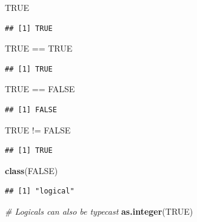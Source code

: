 \documentclass[a4paper]{book}
\newenvironment{Shaded}{\begin{snugshade}}{\end{snugshade}}
\newcommand{\KeywordTok}[1]{\textcolor[rgb]{0.13,0.29,0.53}{\textbf{{#1}}}}
\newcommand{\StringTok}[1]{\textcolor[rgb]{0.31,0.60,0.02}{{#1}}}
\newcommand{\CommentTok}[1]{\textcolor[rgb]{0.56,0.35,0.01}{\textit{{#1}}}}
\newcommand{\OtherTok}[1]{\textcolor[rgb]{0.56,0.35,0.01}{{#1}}}
\newcommand{\NormalTok}[1]{{#1}}
\renewenvironment{Shaded}
{\vspace{1.5em}\begin{leftbar}\begin{snugshade}}
{\end{snugshade}\end{leftbar}\vspace{3pt}}
\begin{document}
\begin{Shaded}
\begin{Highlighting}[]
\OtherTok{TRUE}
\end{Highlighting}
\end{Shaded}

\begin{verbatim}
## [1] TRUE
\end{verbatim}

\begin{Shaded}
\begin{Highlighting}[]
\OtherTok{TRUE} \NormalTok{==}\StringTok{ }\OtherTok{TRUE}
\end{Highlighting}
\end{Shaded}

\begin{verbatim}
## [1] TRUE
\end{verbatim}

\begin{Shaded}
\begin{Highlighting}[]
\OtherTok{TRUE} \NormalTok{==}\StringTok{ }\OtherTok{FALSE}
\end{Highlighting}
\end{Shaded}

\begin{verbatim}
## [1] FALSE
\end{verbatim}

\begin{Shaded}
\begin{Highlighting}[]
\OtherTok{TRUE} \NormalTok{!=}\StringTok{ }\OtherTok{FALSE}
\end{Highlighting}
\end{Shaded}

\begin{verbatim}
## [1] TRUE
\end{verbatim}

\begin{Shaded}
\begin{Highlighting}[]
\KeywordTok{class}\NormalTok{(}\OtherTok{FALSE}\NormalTok{)}
\end{Highlighting}
\end{Shaded}

\begin{verbatim}
## [1] "logical"
\end{verbatim}

\begin{Shaded}
\begin{Highlighting}[]
\CommentTok{# Logicals can also be typecast}
\KeywordTok{as.integer}\NormalTok{(}\OtherTok{TRUE}\NormalTok{)}
\end{Highlighting}
\end{Shaded}
\end{document}
